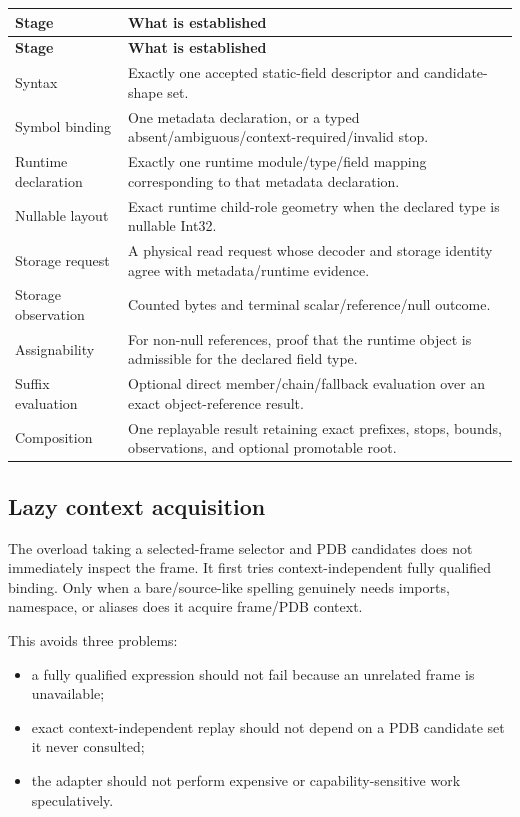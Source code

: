\documentclass[11pt,oneside,openany]{book}
\begin{document}
\begin{longtable}{L{42mm}L{107mm}}
\toprule
\textbf{Stage} & \textbf{What is established} \\
\midrule
\endfirsthead
\toprule
\textbf{Stage} & \textbf{What is established} \\
\midrule
\endhead
Syntax & Exactly one accepted static-field descriptor and candidate-shape set. \\
Symbol binding & One metadata declaration, or a typed absent/ambiguous/context-required/invalid stop. \\
Runtime declaration & Exactly one runtime module/type/field mapping corresponding to that metadata declaration. \\
Nullable layout & Exact runtime child-role geometry when the declared type is nullable Int32. \\
Storage request & A physical read request whose decoder and storage identity agree with metadata/runtime evidence. \\
Storage observation & Counted bytes and terminal scalar/reference/null outcome. \\
Assignability & For non-null references, proof that the runtime object is admissible for the declared field type. \\
Suffix evaluation & Optional direct member/chain/fallback evaluation over an exact object-reference result. \\
Composition & One replayable result retaining exact prefixes, stops, bounds, observations, and optional promotable root. \\
\bottomrule
\end{longtable}

\subsection{Lazy context acquisition}

The overload taking a selected-frame selector and PDB candidates does not immediately inspect the frame. It first tries context-independent fully qualified binding. Only when a bare/source-like spelling genuinely needs imports, namespace, or aliases does it acquire frame/PDB context.

This avoids three problems:

\begin{itemize}
  \item a fully qualified expression should not fail because an unrelated frame is unavailable;
  \item exact context-independent replay should not depend on a PDB candidate set it never consulted;
  \item the adapter should not perform expensive or capability-sensitive work speculatively.
\end{itemize}
\end{document}
